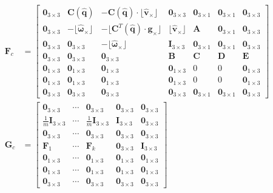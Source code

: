 \documentclass[10pt,a4paper]{article}
\newcommand{\skewsym}[1]{\lfloor #1 _\times \rfloor}
\begin{document}
\begin{align}
\mathbf{F}_c &=  \begin{bmatrix}
\mathbf{0}_{3\times3} & \mathbf{C}(\hat{\mathbf{q}}) & -\mathbf{C}(\hat{\mathbf{q}}) \cdot \skewsym{\hat{\mathbf{v}}} & \mathbf{0}_{3\times3} & \mathbf{0}_{3\times1} & \mathbf{0}_{3\times1} & \mathbf{0}_{3\times3} \\
\mathbf{0}_{3\times3} & -\skewsym{\hat{\boldsymbol{\omega}}} & - \skewsym{\mathbf{C}^T(\hat{\mathbf{q}}) \cdot \mathbf{g} } & \skewsym{\hat{\mathbf{v}}} & \mathbf{A} & \mathbf{0}_{3\times1} & \mathbf{0}_{3\times3} \\
\mathbf{0}_{3\times3} & \mathbf{0}_{3\times3} & -\skewsym{\hat{\boldsymbol{\omega}}} & \mathbf{I}_{3\times3} & \mathbf{0}_{3\times1} & \mathbf{0}_{3\times1} & \mathbf{0}_{3\times3} \\
\mathbf{0}_{3\times3} & \mathbf{0}_{3\times3} & \mathbf{0}_{3\times3} & \mathbf{B} & \mathbf{C} & \mathbf{D} & \mathbf{E} \\
\mathbf{0}_{1\times3} & \mathbf{0}_{1\times3} & \mathbf{0}_{1\times3} & \mathbf{0}_{1\times3} & 0 & 0 & \mathbf{0}_{1\times3} \\
\mathbf{0}_{1\times3} & \mathbf{0}_{1\times3} & \mathbf{0}_{1\times3} & \mathbf{0}_{1\times3} & 0 & 0 & \mathbf{0}_{1\times3} \\
\mathbf{0}_{3\times3} & \mathbf{0}_{3\times3} & \mathbf{0}_{3\times3} & \mathbf{0}_{3\times3} & \mathbf{0}_{3\times1} & \mathbf{0}_{3\times1} & \mathbf{0}_{3\times3}
\end{bmatrix} \\
\mathbf{G}_c &= \begin{bmatrix}
\mathbf{0}_{3\times3} & \cdots & \mathbf{0}_{3\times3} & \mathbf{0}_{3\times3} & \mathbf{0}_{3\times3} \\
\frac{1}{m} \mathbf{I}_{3\times3} & \cdots & \frac{1}{m} \mathbf{I}_{3\times3} & \mathbf{I}_{3\times3} & \mathbf{0}_{3\times3} \\
\mathbf{0}_{3\times3} & \cdots & \mathbf{0}_{3\times3} & \mathbf{0}_{3\times3} & \mathbf{0}_{3\times3} \\
\mathbf{F}_1 & \cdots & \mathbf{F}_k & \mathbf{0}_{3\times3} & \mathbf{I}_{3\times3} \\
\mathbf{0}_{1\times3} & \cdots & \mathbf{0}_{1\times3} & \mathbf{0}_{1\times3} & \mathbf{0}_{1\times3} \\
\mathbf{0}_{1\times3} & \cdots & \mathbf{0}_{1\times3} & \mathbf{0}_{1\times3} & \mathbf{0}_{1\times3} \\
\mathbf{0}_{3\times3} & \cdots & \mathbf{0}_{3\times3} & \mathbf{0}_{3\times3} & \mathbf{0}_{3\times3} 
\end{bmatrix}
\end{align}
\end{document}
